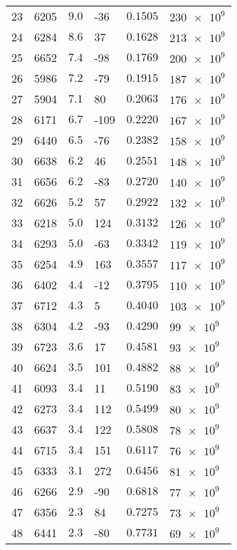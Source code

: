 \documentclass[a4paper,german,12pt,smallheadings]{scrartcl}
\begin{document}
\begin{enumerate}[a)]
\begin{longtable}{|l|l|l|l|l|l|}
    23 & 6205 & $\num{ 9.0}$ & -36  & $\num{0.1505}$ & $\num{230e9}$ \\
    24 & 6284 & $\num{ 8.6}$ & 37   & $\num{0.1628}$ & $\num{213e9}$ \\
    25 & 6652 & $\num{ 7.4}$ & -98  & $\num{0.1769}$ & $\num{200e9}$ \\
    26 & 5986 & $\num{ 7.2}$ & -79  & $\num{0.1915}$ & $\num{187e9}$ \\
    27 & 5904 & $\num{ 7.1}$ & 80   & $\num{0.2063}$ & $\num{176e9}$ \\
    28 & 6171 & $\num{ 6.7}$ & -109 & $\num{0.2220}$ & $\num{167e9}$ \\
    29 & 6440 & $\num{ 6.5}$ & -76  & $\num{0.2382}$ & $\num{158e9}$ \\
    30 & 6638 & $\num{ 6.2}$ & 46   & $\num{0.2551}$ & $\num{148e9}$ \\
    31 & 6656 & $\num{ 6.2}$ & -83  & $\num{0.2720}$ & $\num{140e9}$ \\
    32 & 6626 & $\num{ 5.2}$ & 57   & $\num{0.2922}$ & $\num{132e9}$ \\
    33 & 6218 & $\num{ 5.0}$ & 124  & $\num{0.3132}$ & $\num{126e9}$ \\
    34 & 6293 & $\num{ 5.0}$ & -63  & $\num{0.3342}$ & $\num{119e9}$ \\
    35 & 6254 & $\num{ 4.9}$ & 163  & $\num{0.3557}$ & $\num{117e9}$ \\
    36 & 6402 & $\num{ 4.4}$ & -12  & $\num{0.3795}$ & $\num{110e9}$ \\
    37 & 6712 & $\num{ 4.3}$ & 5    & $\num{0.4040}$ & $\num{103e9}$ \\
    38 & 6304 & $\num{ 4.2}$ & -93  & $\num{0.4290}$ & $\num{ 99e9}$ \\
    39 & 6723 & $\num{ 3.6}$ & 17   & $\num{0.4581}$ & $\num{ 93e9}$ \\
    40 & 6624 & $\num{ 3.5}$ & 101  & $\num{0.4882}$ & $\num{ 88e9}$ \\
    41 & 6093 & $\num{ 3.4}$ & 11   & $\num{0.5190}$ & $\num{ 83e9}$ \\
    42 & 6273 & $\num{ 3.4}$ & 112  & $\num{0.5499}$ & $\num{ 80e9}$ \\
    43 & 6637 & $\num{ 3.4}$ & 122  & $\num{0.5808}$ & $\num{ 78e9}$ \\
    44 & 6715 & $\num{ 3.4}$ & 151  & $\num{0.6117}$ & $\num{ 76e9}$ \\
    45 & 6333 & $\num{ 3.1}$ & 272  & $\num{0.6456}$ & $\num{ 81e9}$ \\
    46 & 6266 & $\num{ 2.9}$ & -90  & $\num{0.6818}$ & $\num{ 77e9}$ \\
    47 & 6356 & $\num{ 2.3}$ & 84   & $\num{0.7275}$ & $\num{ 73e9}$ \\
    48 & 6441 & $\num{ 2.3}$ & -80  & $\num{0.7731}$ & $\num{ 69e9}$ \\
    \hline
    \end{longtable}

\end{enumerate}
\end{document}
